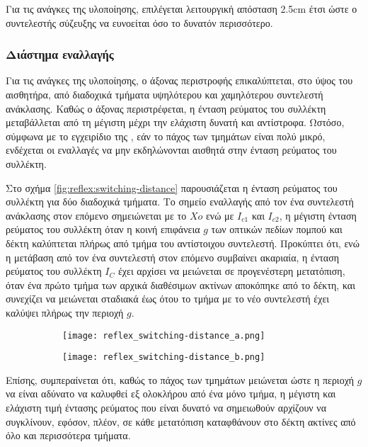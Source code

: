 Για τις ανάγκες της υλοποίησης, επιλέγεται λειτουργική απόσταση 2.5cm έτσι ώστε
ο συντελεστής σύζευξης να ευνοείται όσο το δυνατόν περισσότερο.

\subsubsection{Διάστημα εναλλαγής}

Για τις ανάγκες της υλοποίησης, ο άξονας περιστροφής επικαλύπτεται, στο ύψος του
αισθητήρα, από διαδοχικά τμήματα υψηλότερου και χαμηλότερου συντελεστή
ανάκλασης. Καθώς ο άξονας περιστρέφεται, η ένταση ρεύματος του συλλέκτη
μεταβάλλεται από τη μέγιστη μέχρι την ελάχιστη δυνατή και αντίστροφα.
Ωστόσο, σύμφωνα με το εγχειρίδιο της \textcite{vishay06}, εάν το πάχος των
τμημάτων είναι πολύ μικρό, ενδέχεται οι εναλλαγές να μην εκδηλώνονται αισθητά
στην ένταση ρεύματος του συλλέκτη.

Στο σχήμα \ref{fig:reflex:switching-distance} παρουσιάζεται η ένταση ρεύματος
του συλλέκτη για δύο διαδοχικά τμήματα.
Το σημείο εναλλαγής από τον ένα συντελεστή ανάκλασης στον επόμενο σημειώνεται
με το $Xo$ ενώ με $I_{c1}$ και $I_{c2}$, η μέγιστη ένταση ρεύματος του
συλλέκτη όταν η κοινή επιφάνεια $g$ των οπτικών πεδίων πομπού και δέκτη
καλύπτεται πλήρως από τμήμα του αντίστοιχου συντελεστή.
Προκύπτει ότι, ενώ η μετάβαση από τον ένα συντελεστή στον επόμενο συμβαίνει
ακαριαία, η ένταση ρεύματος του συλλέκτη $I_C$ έχει αρχίσει να μειώνεται σε
προγενέστερη μετατόπιση, όταν ένα πρώτο τμήμα των αρχικά διαθέσιμων ακτίνων
αποκόπηκε από το δέκτη, και συνεχίζει να μειώνεται σταδιακά έως ότου το τμήμα με
το νέο συντελεστή έχει καλύψει πλήρως την περιοχή $g$.

\begin{figure}
    \caption{Σχέση μεταβολής ρεύματος $I_C$ και συντελεστή ανάκλασης.
        \label{fig:reflex:switching-distance}}
    \begin{center}
        \begin{subfigure}{0.45\linewidth}
            \texttt{[image: reflex\_switching-distance\_a.png]}
        \end{subfigure}
        \begin{subfigure}{0.45\linewidth}
            \texttt{[image: reflex\_switching-distance\_b.png]}
        \end{subfigure}
    \end{center}
\end{figure}

Επίσης, συμπεραίνεται ότι, καθώς το πάχος των τμημάτων μειώνεται ώστε η περιοχή
$g$ να είναι αδύνατο να καλυφθεί εξ ολοκλήρου από ένα μόνο τμήμα, η μέγιστη και
ελάχιστη τιμή έντασης ρεύματος που είναι δυνατό να σημειωθούν αρχίζουν να
συγκλίνουν, εφόσον, πλέον, σε κάθε μετατόπιση καταφθάνουν στο δέκτη ακτίνες από
όλο και περισσότερα τμήματα.

